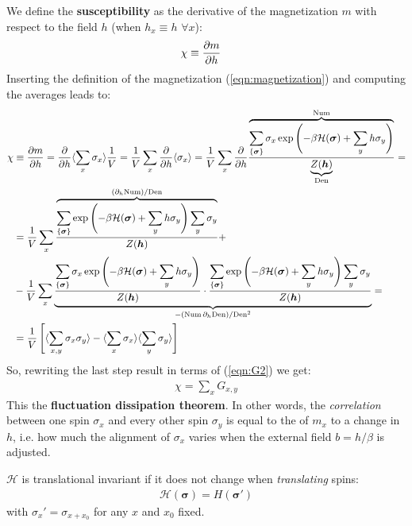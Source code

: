 \documentclass[../../main.tex]{subfiles}
\begin{document}
We define the \textbf{susceptibility} as the derivative of the magnetization $m$ with respect to the field $h$ (when $h_x \equiv h$ $\forall x$):
\begin{align*}
    \chi &\equiv \pdv{m}{h}
\end{align*}
Inserting the definition of the magnetization (\ref{eqn:magnetization}) and computing the averages leads to:
\vspace{-2em}
\begin{align*}
    \chi &\equiv \pdv{m}{h} = \pdv{h} \langle \sum_x \sigma_x \rangle \frac{1}{V} = \frac{1}{V} \sum_x \pdv{h} \langle \sigma_x \rangle  = \frac{1}{V} \sum_x \pdv{h}
    \frac{\displaystyle \overbrace{\sum_{\{\bm{\sigma}\}} \sigma_x \exp\left(- \beta \mathcal{H}(\bm{\sigma}) + \sum_y h \sigma_y \right)}^{\mathclap{\mathrm{Num}}} }{\underbrace{Z(\bm{h})}_{\mathrm{Den}} } = \\
    &= \frac{1}{V} \sum_x 
    \frac{\displaystyle \overbrace{\sum_{\{\bm{\sigma}\}} \exp\left(-\beta \mathcal{H}(\bm{\sigma}) + \sum_y h \sigma_y\right) \sum_y \sigma_y}^{(\partial_h \mathrm{Num}) / \mathrm{Den}  } }
         {Z(\bm{h})} +\\
    &-\frac{1}{V}\sum_x \underbrace{\frac{\displaystyle 
    \sum_{\{\bm{\sigma}\}} \sigma_x \exp\left(- \beta \mathcal{H}(\bm{\sigma}) + \sum_y h \sigma_y\right)}{Z(\bm{h})}\cdot \frac{\displaystyle \sum_{\{\bm{\sigma}\}} \exp\left(-\beta \mathcal{H}(\bm{\sigma}) + \sum_y h \sigma_y \right) \sum_y \sigma_y}{Z(\bm{h})} }_{-(\mathrm{Num} \,\partial_h \mathrm{Den}) / \mathrm{Den}^2 } =\\
    &= \frac{1}{V}\left[\langle \sum_{x,y} \sigma_x \sigma_y \rangle - \langle \sum_x \sigma_x \rangle \langle \sum_y \sigma_y \rangle\right] 
\end{align*}
So, rewriting the last step result in terms of (\ref{eqn:G2}) we get:
\begin{align*}
    \chi = \sum_x G_{x,y}
\end{align*}
This the \textbf{fluctuation dissipation theorem}. In other words, the  \textit{correlation} between one spin $\sigma_x$ and every other spin $\sigma_y$ is equal to the  of $m_x$ to a change in $h$, i.e. how much the alignment of $\sigma_x$ varies when the external field $b = h/\beta$ is adjusted.
 
\medskip

$\mathcal{H}$ is translational invariant if it does not change when \textit{translating} spins: 
\begin{align*}
    \mathcal{H}(\bm{\sigma}) = H(\bm{\sigma}')
\end{align*}
with $\sigma_x' = \sigma_{x+x_0}$ for any $x$ and $x_0$ fixed.
\end{document}
